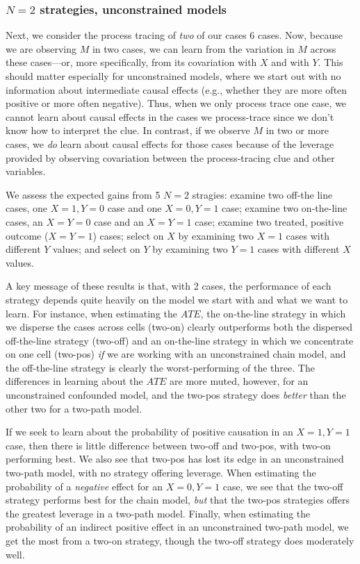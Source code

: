 \documentclass[
  12pt,
]{book}
\begin{document}
\hypertarget{n2-strategies-unconstrained-models}{%
\subsubsection{\texorpdfstring{\(N=2\) strategies, unconstrained models}{N=2 strategies, unconstrained models}}\label{n2-strategies-unconstrained-models}}

Next, we consider the process tracing of \emph{two} of our cases 6 cases. Now, because we are observing \(M\) in two cases, we can learn from the variation in \(M\) across these cases---or, more specifically, from its covariation with \(X\) and with \(Y\). This should matter especially for unconstrained models, where we start out with no information about intermediate causal effects (e.g., whether they are more often positive or more often negative). Thus, when we only process trace one case, we cannot learn about causal effects in the cases we process-trace since we don't know how to interpret the clue. In contrast, if we observe \(M\) in two or more cases, we \emph{do} learn about causal effects for those cases because of the leverage provided by observing covariation between the process-tracing clue and other variables.

We assess the expected gains from 5 \(N=2\) stragies: examine two off-the line cases, one \(X=1, Y=0\) case and one \(X=0, Y=1\) case; examine two on-the-line cases, an \(X=Y=0\) case and an \(X=Y=1\) case; examine two treated, positive outcome (\(X=Y=1\)) cases; select on \(X\) by examining two \(X=1\) cases with different \(Y\) values; and select on \(Y\) by examining two \(Y=1\) cases with different \(X\) values.

A key message of these results is that, with 2 cases, the performance of each strategy depends quite heavily on the model we start with and what we want to learn. For instance, when estimating the \(ATE\), the on-the-line strategy in which we disperse the cases across cells (two-on) clearly outperforms both the dispersed off-the-line strategy (two-off) and an on-the-line strategy in which we concentrate on one cell (two-pos) \emph{if} we are working with an unconstrained chain model, and the off-the-line strategy is clearly the worst-performing of the three. The differences in learning about the \(ATE\) are more muted, however, for an unconstrained confounded model, and the two-pos strategy does \emph{better} than the other two for a two-path model.

If we seek to learn about the probability of positive causation in an \(X=1, Y=1\) case, then there is little difference between two-off and two-pos, with two-on performing best. We also see that two-pos has lost its edge in an unconstrained two-path model, with no strategy offering leverage. When estimating the probability of a \emph{negative} effect for an \(X=0, Y=1\) case, we see that the two-off strategy performs best for the chain model, \emph{but} that the two-pos strategies offers the greatest leverage in a two-path model. Finally, when estimating the probability of an indirect positive effect in an unconstrained two-path model, we get the most from a two-on strategy, though the two-off strategy does moderately well.
\end{document}
